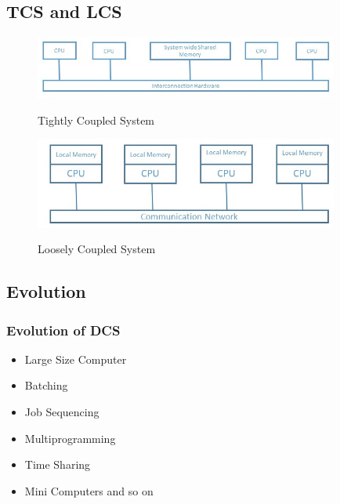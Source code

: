 \documentclass{beamer}
\begin{document}
\subsection{TCS and LCS}
    \begin{frame}
        \begin{figure}
            \centering
            \includegraphics[width=10cm]{tightlyCoupledSystem}\\
            \caption{Tightly Coupled System}
        \end{figure}
        \begin{figure}
            \centering
            \includegraphics[width=10cm]{looselyCoupledSystem}\\
            \caption{Loosely Coupled System}
        \end{figure}
    \end{frame}



\subsection{Evolution}\label{DCS}
    \begin{frame}
        \frametitle{Evolution of DCS}
        \begin{itemize}
        	\item Large Size Computer
        	\item Batching
        	\item Job Sequencing
        	\item Multiprogramming
        	\item Time Sharing
        	\item Mini Computers and so on
        \end{itemize}
        \vspace{4cm}
    \end{frame}
\end{document}
